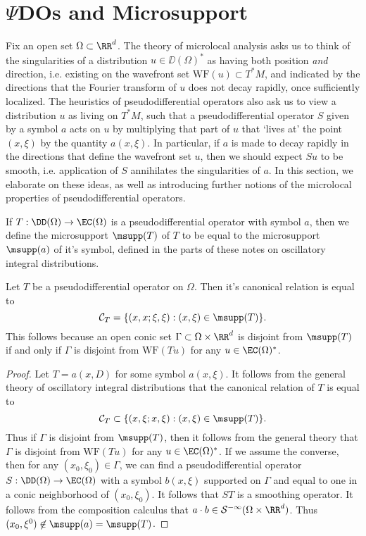 \section{$\Psi$DOs and Microsupport}

Fix an open set $\Omega \subset \RR^d$. The theory of microlocal analysis asks us to think of the singularities of a distribution $u \in \DD(\Omega)^*$ as having both position \emph{and} direction, i.e. existing on the wavefront set $\text{WF}(u) \subset T^* M$, and indicated by the directions that the Fourier transform of $u$ does not decay rapidly, once sufficiently localized. The heuristics of pseudodifferential operators also ask us to view a distribution $u$ as living on $T^*M$, such that a pseudodifferential operator $S$ given by a symbol $a$ acts on $u$ by multiplying that part of $u$ that `lives at' the point $(x,\xi)$ by the quantity $a(x,\xi)$. In particular, if $a$ is made to decay rapidly in the directions that define the wavefront set $u$, then we should expect $Su$ to be smooth, i.e. application of $S$ annihilates the singularities of $a$. In this section, we elaborate on these ideas, as well as introducing further notions of the microlocal properties of pseudodifferential operators.

If $T: \DD(\Omega) \to \EC(\Omega)$ is a pseudodifferential operator with symbol $a$, then we define the microsupport $\msupp(T)$ of $T$ to be equal to the microsupport $\msupp(a)$ of it's symbol, defined in the parts of these notes on oscillatory integral distributions.

\begin{lemma}
    Let $T$ be a pseudodifferential operator on $\Omega$. Then it's canonical relation is equal to
    \[ \mathcal{C}_T = \{ (x,x;\xi,\xi): (x,\xi) \in \msupp(T) \}. \]
    This follows because an open conic set $\Gamma \subset \Omega \times \RR^d$ is disjoint from $\msupp(T)$ if and only if $\Gamma$ is disjoint from $\text{WF}(Tu)$ for any $u \in \EC(\Omega)^*$.
\end{lemma}
\begin{proof}
    Let $T = a(x,D)$ for some symbol $a(x,\xi)$. It follows from the general theory of oscillatory integral distributions that the canonical relation of $T$ is equal to
    \[ \mathcal{C}_T \subset \{ (x,\xi;x,\xi): (x,\xi) \in \msupp(T) \}. \]
    Thus if $\Gamma$ is disjoint from $\msupp(T)$, then it follows from the general theory that $\Gamma$ is disjoint from $\text{WF}(Tu)$ for any $u \in \EC(\Omega)^*$. If we assume the converse, then for any $(x_0,\xi_0) \in \Gamma$, we can find a pseudodifferential operator $S: \DD(\Omega) \to \EC(\Omega)$ with a symbol $b(x,\xi)$ supported on $\Gamma$ and equal to one in a conic neighborhood of $(x_0,\xi_0)$. It follows that $ST$ is a smoothing operator. It follows from the composition calculus that $a \cdot b \in \mathcal{S}^{-\infty}(\Omega \times \RR^d)$. Thus $(x_0,\xi^0) \not \in \msupp(a) = \msupp(T)$.
\end{proof}

